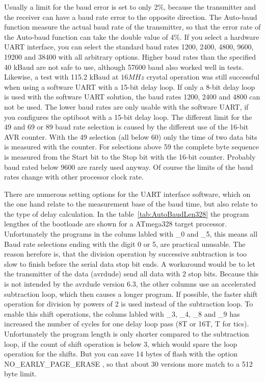 Usually a limit for the baud error is set to only 2\%, because the transmitter and
the receiver can have a baud rate error to the opposite direction.
The Auto-baud function measure the actual baud rate of the transmitter,
so that the error rate of the Auto-baud function can take the double value of 4\%.
If you select a hardware UART interface, you can select the standard
baud rates 1200, 2400, 4800, 9600, 19200 and 38400 with all arbitrary options.
Higher baud rates than the specified 40 kBaud are not safe to use,
although 57600 baud also worked well in tests.
Likewise, a test with 115.2 kBaud at \(16MHz\) crystal operation was still successful
when using a software UART with a 15-bit delay loop.
If only a 8-bit delay loop is used with the software UART solution,
the baud rates 1200, 2400 and 4800 can not be used.
The lower baud rates are only usable with the software UART, if you configures
the optiboot with a 15-bit delay loop.
The different limit for the 49 and 69 or 89 baud rate selection is caused
by the different use of the 16-bit AVR counter.
With the 49 selection (all below 60) only the time of two data bits is measured
with the counter. For selections above 59 the complete byte sequence is
measured from the Start bit to the Stop bit with the 16-bit counter.
Probably baud rated below 9600 are rarely used anyway.
Of course the limits of the baud rates change with other processor clock rate.

There are numerous setting options for the UART interface software, which on the
one hand relate to the measurement base of the baud time, but also relate to the type
of delay calculation.
In the table~\ref{tab:AutoBaudLen328} the program lengthes of the bootloade are shown
for a ATmega328 target processor.
Unfortunately the programs in the colums labled with \_0 and \_5, this means all
Baud rate selections ending with the digit 0 or 5, are practical unusable.
The reason herefore is, that the division operation by successive subtraction
is too slow to finish before the serial data stop bit ends.
A workaround would be to let the transmitter of the data (avrdude) send all data with 2 stop bits.
Because this is not intended by the avrdude version 6.3,
the other columns use an accelerated subtraction loop,
which then causes a longer program.
If possible, the faster shift operation for division by powers of 2 is used instead of the subtraction loop.
To enable this shift operations, the colums labled with \_3, \_4, \_8 and \_9 
has increased the number of cycles for one delay loop pass (8T or 16T, T for tics).
Unfortunately the program length is only shorter compared to the subtraction loop,
if the count of shift operation is below 3, which would spare the loop operation for the shifts.
But you can save 14 bytes of flash with the option NO\_EARLY\_PAGE\_ERASE , so that about
30 versions more match to a 512 byte limit.

